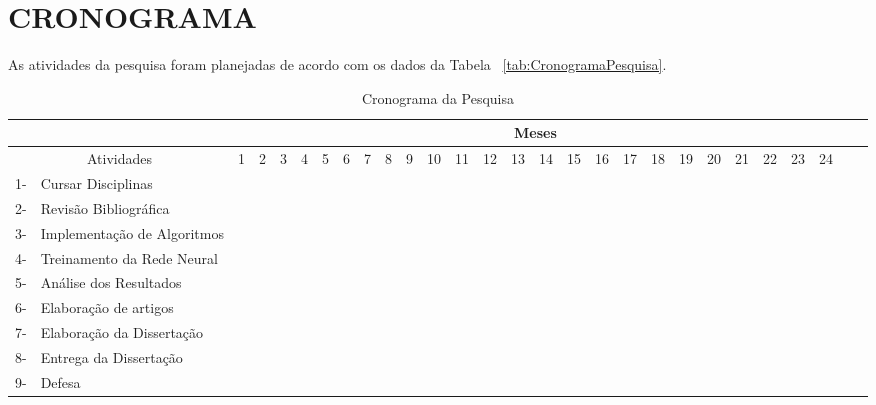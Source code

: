 \section{CRONOGRAMA}
\label{sec:cronograma}

As atividades da pesquisa foram planejadas de acordo com os dados da Tabela ~\vref{tab:CronogramaPesquisa}. 


\begin{table}[ht]
\centering
\begin{adjustbox}{width=1\textwidth}
\small\addtolength{\tabcolsep}{-4pt}
\begin{tabular}{|c l |c|c|c|c|c|c|c|c|c|c|c|c|c|c|c|c|c|c|c|c|c|c|c|c|c|c|}
	\hline
    & & \multicolumn{24}{c|}{Meses}\\
    \hline
	\multicolumn{2}{|c|}{Atividades} & 1 & 2 & 3 & 4 & 5 & 6 & 7 & 8 & 9 & 10 & 11 & 12 & 13 & 14 & 15 & 16 & 17 & 18 & 19 & 20 & 21 & 22 & 23 & 24\\
	\hline
	1- & Cursar Disciplinas 				&\V &\V &\V &\V &\V &\V &\V &\V &\V &\V &\V &\V &  &  &  &  &  &  &  &  &  &  &  &  \\
	2- & Revisão Bibliográfica 			&  &  &  & \V & \V & \V & \V &\V &\V  &\V &\V &\V &\V &\V &\V &\V &\V &\V  &  &  &  &  &  &  \\
	3- & Implementação de Algoritmos 	&   &  &  & \V & \V & \V & \V & \V & \V &\V &\V &\V &\V &\V &\V &\V &\V &\V & & & & & & \\
	4- & Treinamento da Rede Neural 		&   &  &  &  & \V & \V & \V & \V & \V & \V &\V &\V &\V &\V &\V &\V &\V &\V &\V &\V & & & & \\
	5- & Análise dos Resultados 			&   &  &  &  &  &  &  &  &  & &   &   &   &  &\V &\V &\V &\V &\V &\V &\V & & & \\
	6- & Elaboração de artigos 			&   &  &  &  &  &  &  &  & \V  & \V & \V  & \V  & \V  & \V & \V & \V & \V &\V &\V &\V &\V &\V &\V & \\
	7- & Elaboração da Dissertação 		&   &  &  &  &  &  &  &  &  &  &  &\V  &\V  &\V  &\V  &\V  &\V   &\V   &\V    &\V &\V &\V &\V & \\
	8- & Entrega da Dissertação 			&   &  &  &  &  &  &  &  &  &  &  &  &  &  &  &  &   &   &   &   &   &   & \V  & \\
	9- & Defesa 			&   &  &  &  &  &  &  &  &  &  &  &  &  &  &  &  &   &   &   &   &   &   &   & \V \\
	\hline
\end{tabular}
\end{adjustbox}
\caption{Cronograma da Pesquisa} 
\label{tab:CronogramaPesquisa}
\end{table} 